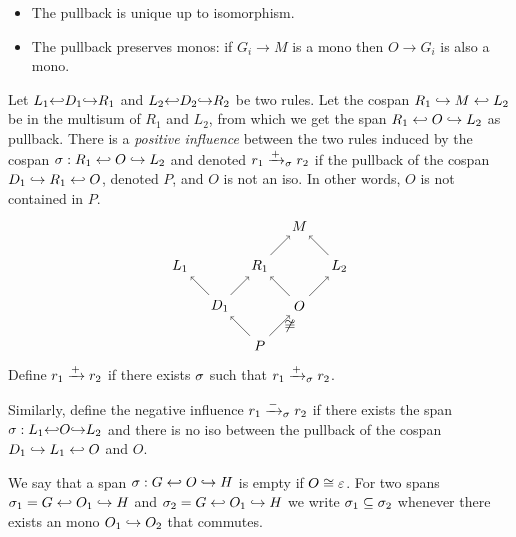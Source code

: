 \begin{property}
  \begin{itemize}
  \item The pullback is unique up to isomorphism.
  \item The pullback preserves monos: if $G_i\to M$ is a mono then $O\to G_i$ is also a mono.
  \end{itemize}
\end{property}

\begin{definition}
  \label{def:pos_infl}
  Let $L_1{\hookleftarrow} D_1 {\hookrightarrow} R_1$ and $L_2{\hookleftarrow} D_2 {\hookrightarrow} R_2$ be two rules.
%
  Let the cospan $R_1\hookrightarrow M\hookleftarrow L_2$ be in the multisum of $R_1$ and $L_2$, from which we get the span $R_1\hookleftarrow O\hookrightarrow L_2$ as pullback.
%
  There is a \emph{positive influence} between the two rules induced by the cospan $\sigma:R_1\hookleftarrow O\hookrightarrow L_2$ and denoted $r_1\mathrel{\xrightarrow{+}}_{\sigma} r_2$ if the pullback of the cospan $D_1\hookrightarrow R_1\hookleftarrow O$, denoted $P$, and $O$ is not an iso. In other words, $O$ is not contained in $P$.
  \[
  \begin{tikzpicture} %
    \node (p) at (0,-1) {\(P\)};
    \node (d1) at (-1,0) {\(D_1\)};
    \node (o) at (1,0) {\(O\)};
    \node (m) at (1,2) {\(M\)};
    \node (r1) at (0,1) {\(R_1\)};
    \node (l1) at (-2,1) {\(L_1\)};
    \node (l2) at (2,1) {\(L_2\)};
    \draw [->] (p) -- (d1);
    \draw [->] (p) -- node [right,midway] {$\not\iso$}  (o);
    \draw [->] (d1) -- (r1);
    \draw [->] (d1) -- (l1);
    \draw [->] (o) -- (r1);
    \draw [->] (o) -- (l2);
    \draw [->] (r1) --  (m);
    \draw [->] (l2) --  (m);
  \end{tikzpicture}
  \]
  Define $r_1\mathrel{\xrightarrow{+}} r_2$ if there exists $\sigma$ such that $r_1\mathrel{\xrightarrow{+}}_{\sigma} r_2$.
\end{definition}

Similarly, define the negative influence $r_1\mathrel{\xrightarrow{-}}_{\sigma} r_2$ if there exists the span $\sigma:L_1{\hookleftarrow} O {\hookrightarrow} L_2$ and there is no iso between the pullback of the cospan $D_1\hookrightarrow L_1\hookleftarrow O$ and $O$.

We say that a span $\sigma:G\hookleftarrow O\hookrightarrow H$ is empty if $O\cong\varepsilon$. For two spans $\sigma_1 = G\hookleftarrow O_1\hookrightarrow H$ and $\sigma_2 = G\hookleftarrow O_1\hookrightarrow H$ we write $\sigma_1\subseteq \sigma_2$ whenever there exists an mono $O_1\hookrightarrow O_2$ that commutes.
